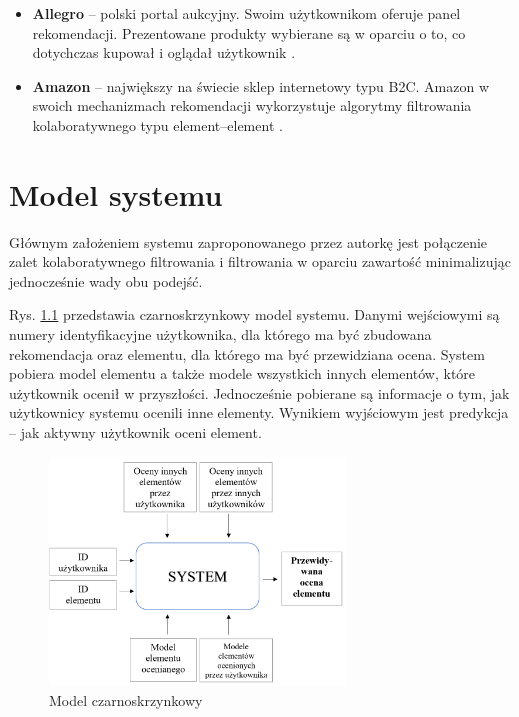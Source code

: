 \documentclass[twoside]{iisthesis}
\begin{document}
		\begin{itemize}
			 \item \textbf{Allegro} -- polski portal aukcyjny. Swoim użytkownikom oferuje panel rekomendacji. Prezentowane produkty wybierane są w oparciu o to, co dotychczas kupował i oglądał użytkownik \cite{id:allegrofaq}. 
			 \item \textbf{Amazon} -- największy na świecie sklep internetowy typu B2C. Amazon w swoich mechanizmach rekomendacji wykorzystuje algorytmy filtrowania kolaboratywnego typu element--element \cite{id:linden2003amazon}.
		 \end{itemize}	 
	  
 
 \chapter{Model systemu}
 
 Głównym założeniem systemu zaproponowanego przez autorkę jest połączenie zalet kolaboratywnego filtrowania i filtrowania w oparciu zawartość minimalizując jednocześnie wady obu podejść. 
 
 Rys. \ref{fig:blackbox} przedstawia czarnoskrzynkowy model systemu. Danymi wejściowymi są numery identyfikacyjne użytkownika, dla którego ma być zbudowana rekomendacja oraz elementu, dla którego ma być przewidziana ocena. System pobiera model elementu a także modele wszystkich innych elementów, które użytkownik ocenił w przyszłości. Jednocześnie pobierane są informacje o tym, jak użytkownicy systemu ocenili inne elementy. Wynikiem wyjściowym jest predykcja -- jak aktywny użytkownik oceni element.
 
 \begin{figure}[!ht] 
   	\centering
   	\includegraphics[width=0.7\textwidth]{blackbox}
   	\caption{Model czarnoskrzynkowy}
   	\label{fig:blackbox}
 \end{figure}
 
\end{document}

